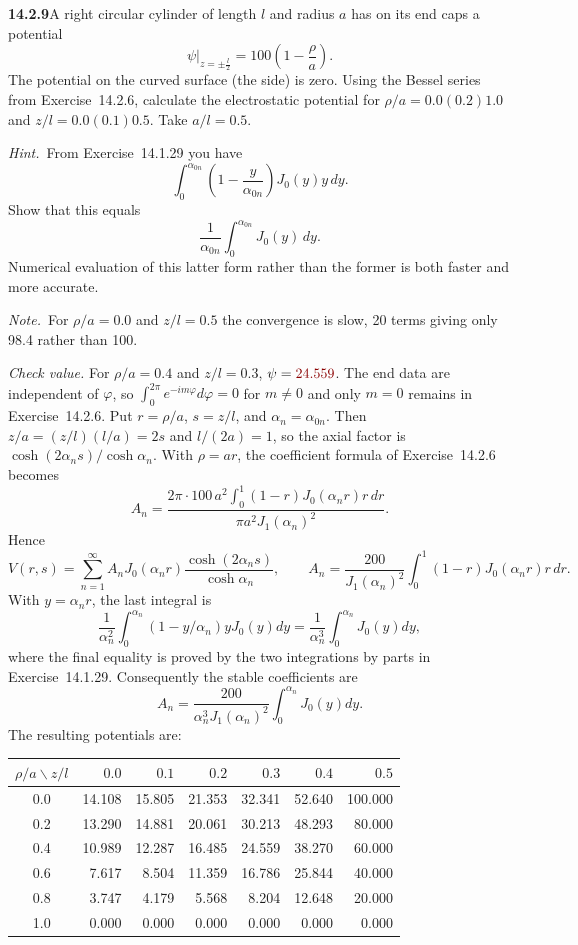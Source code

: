 \par\bigskip
\noindent\textbf{14.2.9}\quad A right circular cylinder of length $l$
and radius $a$ has on its end caps a potential
\[
\psi\Big|_{z=\pm\frac{l}{2}}=100\left(1-\frac{\rho}{a}\right).
\]
The potential on the curved surface (the side) is zero. Using the
Bessel series from Exercise~14.2.6, calculate the electrostatic
potential for $\rho/a=0.0(0.2)1.0$ and $z/l=0.0(0.1)0.5$. Take
$a/l=0.5$.
\par\emph{Hint.}~From Exercise~14.1.29 you have
\[
\int_{0}^{\alpha_{0n}}\left(1-\frac{y}{\alpha_{0n}}\right)J_{0}(y)y\,dy.
\]
Show that this equals
\[
\frac{1}{\alpha_{0n}}\int_{0}^{\alpha_{0n}}J_{0}(y)\,dy.
\]
Numerical evaluation of this latter form rather than the former is
both faster and more accurate.
\par\emph{Note.}~For $\rho/a=0.0$ and $z/l=0.5$ the convergence is
slow, 20 terms giving only 98.4 rather than 100.
\par\nobreak\hfill\emph{Check value.}\enspace
For $\rho/a=0.4$ and $z/l=0.3$, $\psi=\erratum{24.559}$.
\solution
The end data are independent of $\varphi$, so
$\int_0^{2\pi}e^{-im\varphi}d\varphi=0$ for $m\ne0$ and only $m=0$
remains in Exercise~14.2.6. Put $r=\rho/a$, $s=z/l$, and
$\alpha_n=\alpha_{0n}$. Then $z/a=(z/l)(l/a)=2s$ and $l/(2a)=1$,
so the axial factor is $\cosh(2\alpha_ns)/\cosh\alpha_n$. With
$\rho=ar$, the coefficient formula of Exercise~14.2.6 becomes
\[
A_n=\frac{2\pi\cdot100\,a^2\int_0^1(1-r)J_0(\alpha_nr)r\,dr}
{\pi a^2J_1(\alpha_n)^2}.
\]
Hence
\[
\boxed{V(r,s)=\sum_{n=1}^{\infty}A_nJ_0(\alpha_n r)
\frac{\cosh(2\alpha_n s)}{\cosh\alpha_n}},
\qquad
A_n=\frac{200}{J_1(\alpha_n)^2}
\int_0^1(1-r)J_0(\alpha_n r)r\,dr.
\]
With $y=\alpha_n r$, the last integral is
\[
\frac1{\alpha_n^2}\int_0^{\alpha_n}
(1-y/\alpha_n)yJ_0(y)dy
=\frac1{\alpha_n^3}\int_0^{\alpha_n}J_0(y)dy,
\]
where the final equality is proved by the two integrations by
parts in Exercise~14.1.29. Consequently the stable coefficients are
\[
\boxed{A_n=\frac{200}{\alpha_n^3J_1(\alpha_n)^2}
\int_0^{\alpha_n}J_0(y)dy}.
\]
The resulting potentials are:
\begin{center}
\begin{tabular}{c r r r r r r}
\toprule
$\rho/a\backslash z/l$ & $0.0$ & $0.1$ & $0.2$ & $0.3$ & $0.4$ & $0.5$\\
\midrule
0.0 & 14.108 & 15.805 & 21.353 & 32.341 & 52.640 & 100.000 \\
0.2 & 13.290 & 14.881 & 20.061 & 30.213 & 48.293 & 80.000 \\
0.4 & 10.989 & 12.287 & 16.485 & 24.559 & 38.270 & 60.000 \\
0.6 & 7.617 & 8.504 & 11.359 & 16.786 & 25.844 & 40.000 \\
0.8 & 3.747 & 4.179 & 5.568 & 8.204 & 12.648 & 20.000 \\
1.0 & 0.000 & 0.000 & 0.000 & 0.000 & 0.000 & 0.000 \\
\bottomrule
\end{tabular}
\end{center}
